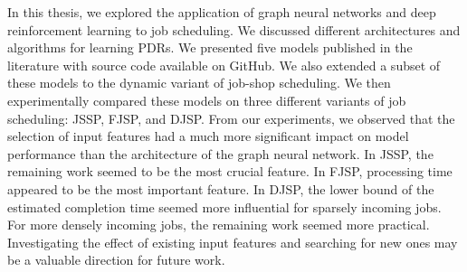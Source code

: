 

In this thesis, we explored the application of graph neural networks and deep reinforcement learning to job scheduling. We discussed different architectures and algorithms for learning PDRs. We presented five models published in the literature with source code available on GitHub. We also extended a subset of these models to the dynamic variant of job-shop scheduling. We then experimentally compared these models on three different variants of job scheduling: JSSP, FJSP, and DJSP. From our experiments, we observed that the selection of input features had a much more significant impact on model performance than the architecture of the graph neural network. In JSSP, the remaining work seemed to be the most crucial feature. In FJSP, processing time appeared to be the most important feature. In DJSP, the lower bound of the estimated completion time seemed more influential for sparsely incoming jobs. For more densely incoming jobs, the remaining work seemed more practical. Investigating the effect of existing input features and searching for new ones may be a valuable direction for future work.

